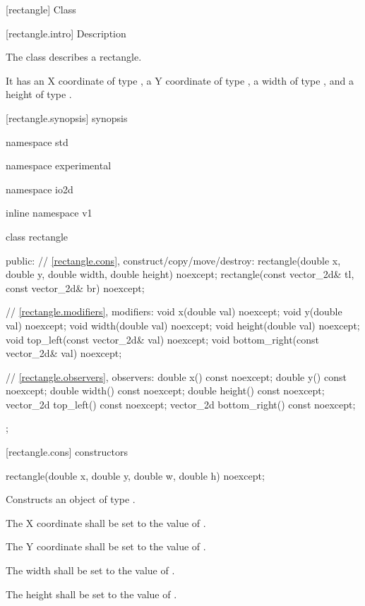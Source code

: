  [rectangle] {Class }

 [rectangle.intro] { Description}

\pnum
{}
The class  describes a rectangle.

\pnum
It has an X coordinate of type , a Y coordinate of type , a width of type , and a height of type .

 [rectangle.synopsis] { synopsis}

\begin{codeblock}
namespace std { namespace experimental { namespace io2d { inline namespace v1 {
  class rectangle {
  public:
    // \ref{rectangle.cons}, construct/copy/move/destroy:
    rectangle(double x, double y, double width, double height) noexcept;
    rectangle(const vector_2d& tl, const vector_2d& br) noexcept;

    // \ref{rectangle.modifiers}, modifiers:
    void x(double val) noexcept;
    void y(double val) noexcept;
    void width(double val) noexcept;
    void height(double val) noexcept;
    void top_left(const vector_2d& val) noexcept;
    void bottom_right(const vector_2d& val) noexcept;
    
    // \ref{rectangle.observers}, observers:
    double x() const noexcept;
    double y() const noexcept;
    double width() const noexcept;
    double height() const noexcept;
    vector_2d top_left() const noexcept;
    vector_2d bottom_right() const noexcept;
  };
} } } }
\end{codeblock}

 [rectangle.cons] { constructors}

\begin{itemdecl}
rectangle(double x, double y, double w, double h) noexcept;
\end{itemdecl}
\begin{itemdescr}
	\pnum
	\effects
	Constructs an object of type .
	
	\pnum
	The X coordinate shall be set to the value of .
	
	\pnum
	The Y coordinate shall be set to the value of .
	
	\pnum
	The width shall be set to the value of .
	
	\pnum
	The height shall be set to the value of .
\end{itemdescr}

